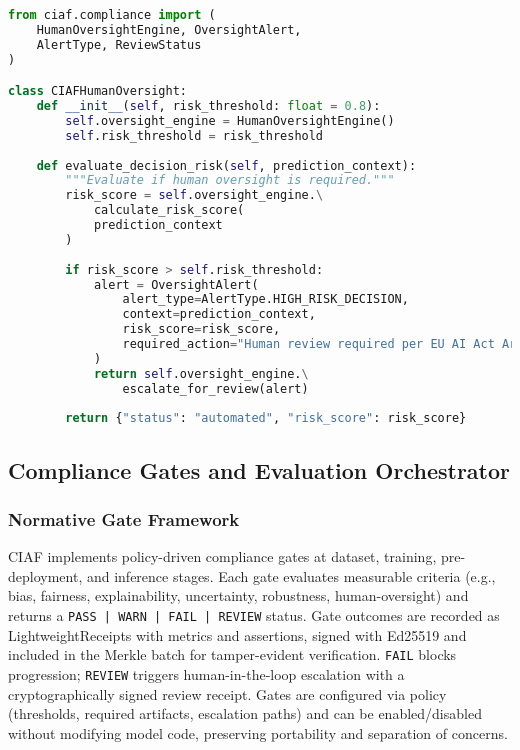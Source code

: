 \documentclass[12pt,a4paper]{article}
\begin{document}
\begin{lstlisting}[language=Python, caption=Human Oversight Implementation]
from ciaf.compliance import (
    HumanOversightEngine, OversightAlert, 
    AlertType, ReviewStatus
)

class CIAFHumanOversight:
    def __init__(self, risk_threshold: float = 0.8):
        self.oversight_engine = HumanOversightEngine()
        self.risk_threshold = risk_threshold
    
    def evaluate_decision_risk(self, prediction_context):
        """Evaluate if human oversight is required."""
        risk_score = self.oversight_engine.\
            calculate_risk_score(
            prediction_context
        )
        
        if risk_score > self.risk_threshold:
            alert = OversightAlert(
                alert_type=AlertType.HIGH_RISK_DECISION,
                context=prediction_context,
                risk_score=risk_score,
                required_action="Human review required per EU AI Act Article 14"
            )
            return self.oversight_engine.\
                escalate_for_review(alert)
        
        return {"status": "automated", "risk_score": risk_score}
\end{lstlisting}

\subsection{Compliance Gates and Evaluation Orchestrator}

\subsubsection{Normative Gate Framework}

CIAF implements policy-driven compliance gates at dataset, training, pre-deployment, and inference stages. Each gate evaluates measurable criteria (e.g., bias, fairness, explainability, uncertainty, robustness, human-oversight) and returns a \texttt{PASS | WARN | FAIL | REVIEW} status. Gate outcomes are recorded as LightweightReceipts with metrics and assertions, signed with Ed25519 and included in the Merkle batch for tamper-evident verification. \texttt{FAIL} blocks progression; \texttt{REVIEW} triggers human-in-the-loop escalation with a cryptographically signed review receipt. Gates are configured via policy (thresholds, required artifacts, escalation paths) and can be enabled/disabled without modifying model code, preserving portability and separation of concerns.
\end{document}
